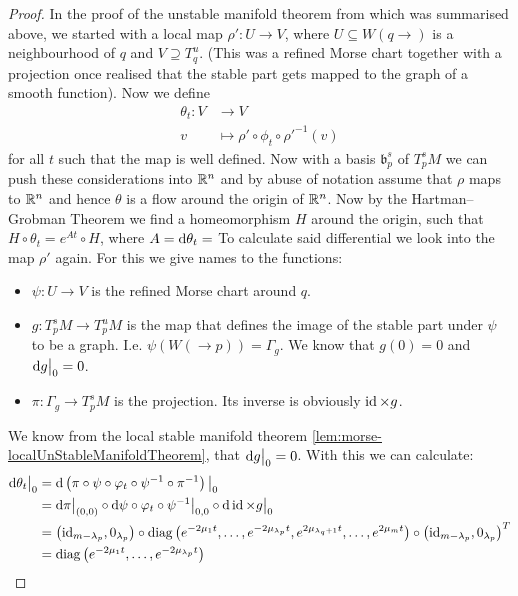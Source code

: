 \begin{proof} 
	In the proof of the unstable manifold theorem from \cite{banyaga2004lectures} which was summarised above, we started with a local map $\rho': U\to V$, where $U\subseteq W(q\to)$ is a neighbourhood of $q$ and $V\supseteq T^u_q$. (This was a refined Morse chart together with a projection once realised that the stable part gets mapped to the graph of a smooth function). Now we define
	\begin{align*}
		\theta_t:V&\to V\\
		v&\mapsto \rho' \circ \phi_t \circ \rho'^{-1}(v)
	\end{align*} for all $t$ such that the map is well defined. Now with a basis $\mathfrak{b}^s_p$ of $T^s_pM$ we can push these considerations into $\mathbb{R}^n$ and by abuse of notation assume that $\rho$ maps to $\mathbb{R}^n$ and hence $\theta$ is a flow around the origin of $\mathbb{R}^n$. Now by the Hartman--Grobman Theorem we find a homeomorphism $H$ around the origin, such that $H\circ \theta_t= e^{At} \circ H$, where $A=\mathop{}\!\mathrm{d} \theta_t=$ To calculate said differential we look into the map $\rho'$ again. For this we give names to the functions:
	\begin{itemize}
		\item $\psi: U \to V$ is the refined Morse chart around $q$.
		\item $g: T^s_pM\to T^u_pM$ is the map that defines the image of the stable part under $\psi$ to be a graph. I.e. $\psi\left(W(\to p)\right)=\Gamma_{g}$. We know that $g(0)=0$ and $\mathop{}\!\mathrm{d} g\big|_0=0$.
		\item $\pi: \Gamma_g\to T^s_pM$ is the projection. Its inverse is obviously $\operatorname{\mathrm{id}}\times g$.
	\end{itemize}
	We know from the local stable manifold theorem \ref{lem:morse-localUnStableManifoldTheorem}, that $\mathop{}\!\mathrm{d} g \big|_0=0$. With this we can calculate:
	\begin{align*}
		\diff \theta_t\big|_0
		&= \diff \left(\pi \circ \psi \circ \phi_t\circ \psi^{-1}\circ \pi^{-1} \right)\big|_0\\
		&= \diff \pi \big|_{(0,0)} \circ \diff \psi \circ \phi_t\circ \psi^{-1} \big|_{0,0}\circ \diff \id\times g \big|_0\\
		&= \left(\id_{m-\lambda_p},0_{\lambda_p}\right) \circ \diag\left(e^{-2\mu_1 t},\dots,e^{-2\mu_{\lambda_p} t},e^{2\mu_{\lambda_q+1} t},\dots ,e^{2\mu_m t} \right) \circ \left(\id_{m-\lambda_p},0_{\lambda_p}\right)^T\\
		&= \diag\left(e^{-2\mu_1 t},\dots,e^{-2\mu_{\lambda_p} t} \right)

\end{align*}
\end{proof}
